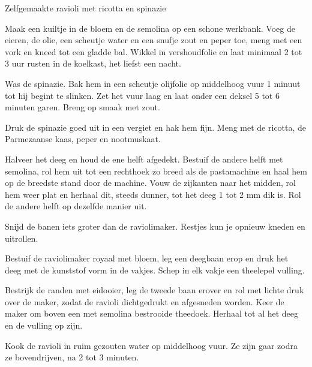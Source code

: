 \begin{recipe}{Zelfgemaakte ravioli met ricotta en spinazie}
\begin{steps}
  \item Maak een kuiltje in de bloem en de semolina op een schone werkbank.
        Voeg de eieren, de olie, een scheutje water en een snufje zout en peper
        toe, meng met een vork en kneed tot een gladde bal. Wikkel in
        vershoudfolie en laat minimaal 2 tot 3 uur rusten in de koelkast, het
        liefst een nacht.
  \item Was de spinazie. Bak hem in een scheutje olijfolie op middelhoog vuur
        1 minuut tot hij begint te slinken. Zet het vuur laag en laat onder
        een deksel 5 tot 6 minuten garen. Breng op smaak met zout.
  \item Druk de spinazie goed uit in een vergiet en hak hem fijn. Meng met de
        ricotta, de Parmezaanse kaas, peper en nootmuskaat.
  \item Halveer het deeg en houd de ene helft afgedekt. Bestuif de andere helft
        met semolina, rol hem uit tot een rechthoek zo breed als de
        pastamachine en haal hem op de breedste stand door de machine. Vouw de
        zijkanten naar het midden, rol hem weer plat en herhaal dit, steeds
        dunner, tot het deeg 1 tot 2 mm dik is. Rol de andere helft op
        dezelfde manier uit.
  \item Snijd de banen iets groter dan de raviolimaker. Restjes kun je opnieuw
        kneden en uitrollen.
  \item Bestuif de raviolimaker royaal met bloem, leg een deegbaan erop en druk
        het deeg met de kunststof vorm in de vakjes. Schep in elk vakje een
        theelepel vulling.
  \item Bestrijk de randen met eidooier, leg de tweede baan erover en rol met
        lichte druk over de maker, zodat de ravioli dichtgedrukt en afgesneden
        worden. Keer de maker om boven een met semolina bestrooide theedoek.
        Herhaal tot al het deeg en de vulling op zijn.
  \item Kook de ravioli in ruim gezouten water op middelhoog vuur. Ze zijn gaar
        zodra ze bovendrijven, na 2 tot 3 minuten.
\end{steps}

\end{recipe}
